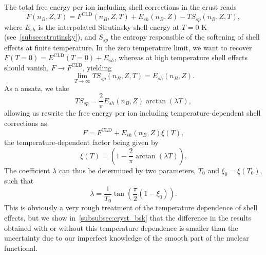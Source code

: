 The total free energy per ion including shell corrections in the crust reads
%
\begin{equation}
  F(n_B,Z,T) = F^{\text{CLD}}(n_B,Z,T) + E_{sh}(n_B,Z) 
  - TS_{sp}(n_B,Z,T),
\end{equation}
%
where $E_{sh}$ is the interpolated Strutinsky shell energy at $T=0$ K
(see~\ref{subsec:strutinsky}), and $S_{sp}$ the entropy responsible of the 
softening of shell effects at finite temperature. 
In the zero temperature limit, we want to recover 
$F(T=0) = E^{\text{CLD}}(T=0) + E_{sh}$, whereas at high
temperature shell effects should vanish, $F \rightarrow 
F^{\text{CLD}}$, yielding
%
\begin{equation}
  \lim_{T\rightarrow \infty} T S_{sp}(n_B,Z,T) = E_{sh}(n_B,Z).
\end{equation}
%
As a ansatz, we take
%
\begin{equation}
  TS_{sp} = \frac{2}{\pi}E_{sh}(n_B,Z)\arctan(\lambda T),
\end{equation}
%
allowing us rewrite the free energy per ion including temperature-dependent 
shell corrections as
%
\begin{equation}
  F = F^{\text{CLD}} + E_{sh}(n_B,Z)\xi(T),
\end{equation}
%
the temperature-dependent factor being given by
%
\begin{equation}
  \xi(T) = \left(1-\frac{2}{\pi}\arctan(\lambda T)\right).
\end{equation}
%
The coefficient $\lambda$ can thus be determined by two parameters, $T_0$ and
$\xi_0 = \xi(T_0)$, such that
%
\begin{equation}
  \lambda = \frac{1}{T_0}\tan\left(\frac{\pi}{2}(1-\xi_0)\right).
\end{equation}
%
This is obviously a very rough treatment of the temperature dependence of shell 
effects, but we show in~\ref{subsubsec:cryst_bsk} that the difference in the 
results obtained with or without this temperature dependence is smaller than 
the uncertainty due to our imperfect knowledge of the smooth part of the 
nuclear functional.
 
